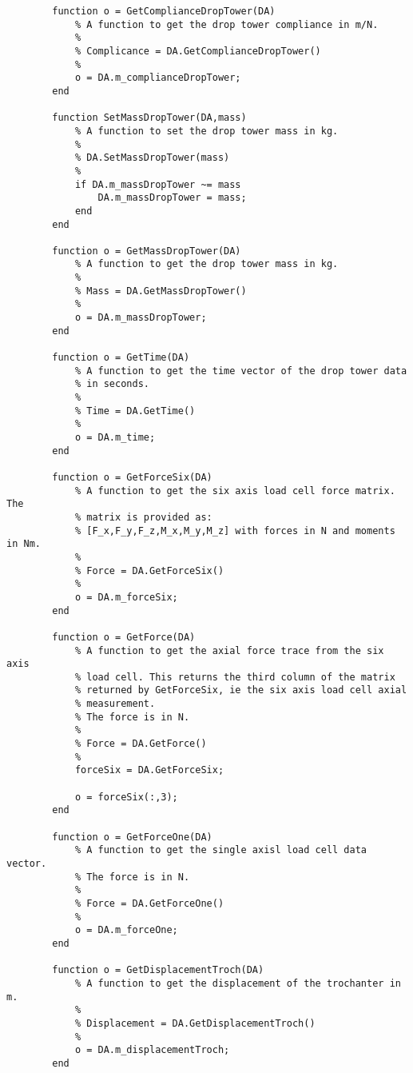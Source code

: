 \begin{lstlisting}
        function o = GetComplianceDropTower(DA)
            % A function to get the drop tower compliance in m/N.
            %
            % Complicance = DA.GetComplianceDropTower()
            %
            o = DA.m_complianceDropTower;
        end
        
        function SetMassDropTower(DA,mass)
            % A function to set the drop tower mass in kg.
            %
            % DA.SetMassDropTower(mass)
            %
            if DA.m_massDropTower ~= mass
                DA.m_massDropTower = mass;
            end
        end
        
        function o = GetMassDropTower(DA)
            % A function to get the drop tower mass in kg.
            %
            % Mass = DA.GetMassDropTower()
            %
            o = DA.m_massDropTower;
        end
        
        function o = GetTime(DA)
            % A function to get the time vector of the drop tower data
            % in seconds.
            %
            % Time = DA.GetTime()
            %
            o = DA.m_time;
        end
        
        function o = GetForceSix(DA)
            % A function to get the six axis load cell force matrix. The
            % matrix is provided as:
            % [F_x,F_y,F_z,M_x,M_y,M_z] with forces in N and moments in Nm.
            %
            % Force = DA.GetForceSix()
            %
            o = DA.m_forceSix;
        end
        
        function o = GetForce(DA)
            % A function to get the axial force trace from the six axis
            % load cell. This returns the third column of the matrix
            % returned by GetForceSix, ie the six axis load cell axial
            % measurement.
            % The force is in N.
            %
            % Force = DA.GetForce()
            %
            forceSix = DA.GetForceSix;
            
            o = forceSix(:,3);
        end            
        
        function o = GetForceOne(DA)
            % A function to get the single axisl load cell data vector.
            % The force is in N.
            %
            % Force = DA.GetForceOne()
            %
            o = DA.m_forceOne;
        end
        
        function o = GetDisplacementTroch(DA)
            % A function to get the displacement of the trochanter in m.
            %
            % Displacement = DA.GetDisplacementTroch()
            %
            o = DA.m_displacementTroch;
        end
        

\end{lstlisting}
